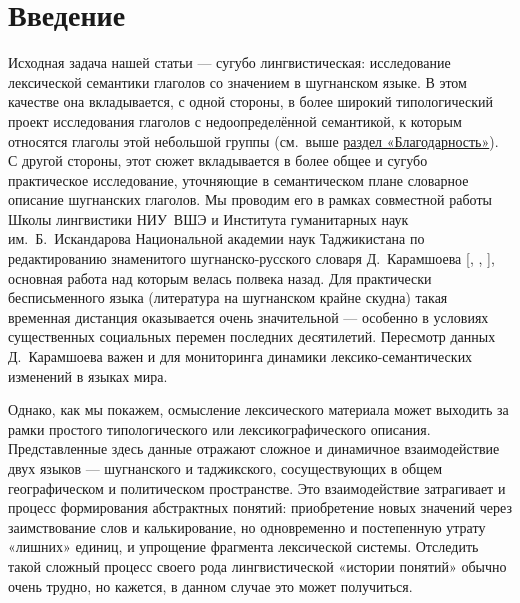 \begin{initialprint}
\end{initialprint}

\section{Введение} \label{hide-intro}

Исходная задача нашей статьи — сугубо лингвистическая: исследование лексической семантики глаголов со значением  в шугнанском языке. В этом качестве она вкладывается, с одной стороны, в более широкий типологический проект исследования глаголов с недоопределённой семантикой, к которым относятся глаголы этой небольшой группы (см.~выше \hyperref[hide-acknow]{раздел «Благодарность»}). С другой стороны, этот сюжет вкладывается в более общее и сугубо практическое исследование, уточняющие в семантическом плане словарное описание шугнанских глаголов. Мы проводим его в рамках совместной работы Школы лингвистики НИУ~ВШЭ и Института гуманитарных наук им.~Б.~Искандарова Национальной академии наук Таджикистана по редактированию знаменитого шугнанско-русского словаря Д.~Карамшоева [\cite*{karamshoev1988}, \cite*{karamshoev1991}, \cite*{karamshoev1999}], основная работа над которым велась полвека назад. Для практически бесписьменного языка (литература на шугнанском крайне скудна) такая временная дистанция оказывается очень значительной — особенно в условиях существенных социальных перемен последних десятилетий. Пересмотр данных Д.~Карамшоева важен и для мониторинга динамики лексико-семантических изменений в языках мира.

Однако, как мы покажем, осмысление лексического материала может выходить за рамки простого типологического или лексикографического описания. Представленные здесь данные отражают сложное и динамичное взаимодействие двух языков — шугнанского и таджикского, сосуществующих в общем географическом и политическом пространстве. Это взаимодействие затрагивает и процесс формирования абстрактных понятий: приобретение новых значений через заимствование слов и калькирование, но одновременно и постепенную утрату «лишних» единиц, и упрощение фрагмента лексической системы. Отследить такой сложный процесс своего рода лингвистической «истории понятий» \parencites{zhivov1996} обычно очень трудно, но кажется, в данном случае это может получиться.

